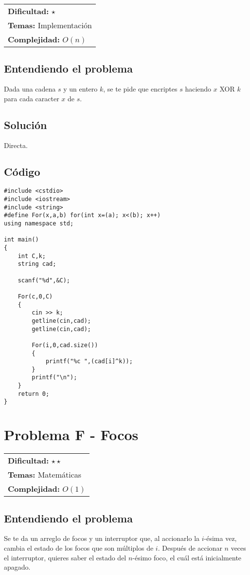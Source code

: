 \hfill
\begin{tabular}{@{}l@{}}
\textbf{Dificultad:} $\star$ \\
\textbf{Temas:} Implementación \\
\textbf{Complejidad:} $O(n)$
\end{tabular}

\subsection*{Entendiendo el problema}
Dada una cadena $s$ y un entero $k$, se te pide que encriptes $s$ haciendo $x$ XOR $k$ para cada caracter $x$ de $s$.
\subsection*{Solución}
Directa.
\subsection*{Código}
\begin{verbatim}
#include <cstdio>
#include <iostream>
#include <string>
#define For(x,a,b) for(int x=(a); x<(b); x++)
using namespace std;
 
int main()
{
    int C,k;
    string cad;
 
    scanf("%d",&C);
 
    For(c,0,C)
    {
        cin >> k;
        getline(cin,cad);
        getline(cin,cad);
 
        For(i,0,cad.size())
        {
            printf("%c ",(cad[i]^k));
        }
        printf("\n");
    }
    return 0;
}
\end{verbatim}

\section{Problema F - Focos}

\hfill
\begin{tabular}{@{}l@{}}
\textbf{Dificultad:} $\star \star$ \\
\textbf{Temas:} Matemáticas \\
\textbf{Complejidad:} $O(1)$
\end{tabular}

\subsection*{Entendiendo el problema}
Se te da un arreglo de focos y un interruptor que, al accionarlo la $i$-ésima vez, cambia el estado de los focos que son múltiplos de $i$. Después de accionar $n$ veces el interruptor, quieres saber el estado del $n$-ésimo foco, el cuál está inicialmente apagado.
